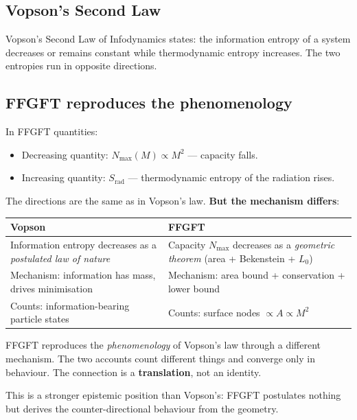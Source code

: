 \subsection{Vopson's Second Law}

Vopson's Second Law of Infodynamics states: the information entropy of a system decreases or remains constant while thermodynamic entropy increases. The two entropies run in opposite directions.

\subsection{FFGFT reproduces the phenomenology}

In FFGFT quantities:
\begin{itemize}
  \item Decreasing quantity: $N_\text{max}(M) \propto M^2$ --- capacity falls.
  \item Increasing quantity: $S_\text{rad}$ --- thermodynamic entropy of the radiation rises.
\end{itemize}

The directions are the same as in Vopson's law. \textbf{But the mechanism differs}:

\begin{center}
\begin{tabular}{p{5cm}p{8cm}}
\toprule
\textbf{Vopson} & \textbf{FFGFT} \\
\midrule
Information entropy decreases as a \emph{postulated law of nature} & Capacity $N_\text{max}$ decreases as a \emph{geometric theorem} (area + Bekenstein + $L_0$) \\
Mechanism: information has mass, drives minimisation & Mechanism: area bound + conservation + lower bound \\
Counts: information-bearing particle states & Counts: surface nodes $\propto A \propto M^2$ \\
\bottomrule
\end{tabular}
\end{center}

\begin{keyresult}
FFGFT reproduces the \emph{phenomenology} of Vopson's law through a different mechanism. The two accounts count different things and converge only in behaviour. The connection is a \textbf{translation}, not an identity.

This is a stronger epistemic position than Vopson's: FFGFT postulates nothing but derives the counter-directional behaviour from the geometry.
\end{keyresult}

